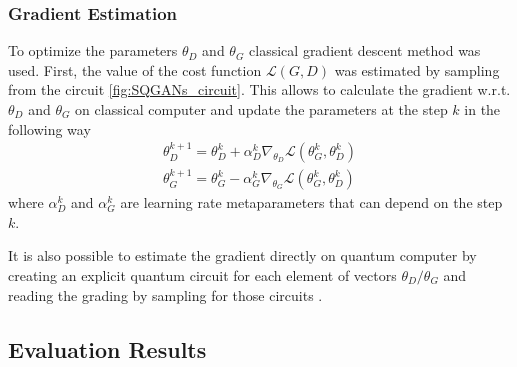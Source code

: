 \subsubsection{Gradient Estimation}
To optimize the parameters $\theta_D$ and $\theta_G$ classical gradient descent
method was used. First, the value of the cost function $\mathcal{L}(G, D)$ was
estimated by sampling from the circuit \ref{fig:SQGANs_circuit}. This allows to
calculate the gradient w.r.t. $\theta_D$ and $\theta_G$ on classical computer
and update the parameters at the step $k$ in the following way
\begin{equation}
  \begin{split}
    \theta^{k+1}_D = \theta^{k}_D + \alpha^k_D\nabla_{\theta_D}\mathcal{L}(\theta^k_G, \theta^k_D) \\
    \theta^{k+1}_G = \theta^{k}_G - \alpha^k_G\nabla_{\theta_G}\mathcal{L}(\theta^k_G, \theta^k_D)
  \end{split}
\end{equation}
where $\alpha^k_D$ and $\alpha^k_G$ are learning rate metaparameters that can
depend on the step $k$.

It is also possible to estimate the gradient directly on quantum computer by
creating an explicit quantum circuit for each element of vectors $\theta_D / \theta_G$
and reading the grading by sampling for those circuits \cite{Dallaire_Demers_2018}.
\subsection{Evaluation Results}
